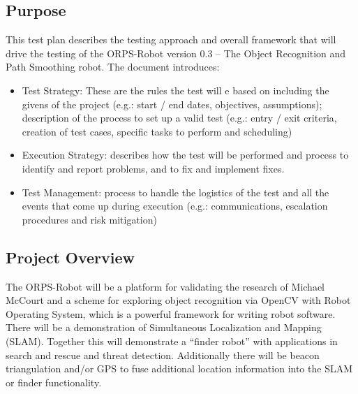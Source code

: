 \documentclass[english,12pt]{article}
\begin{document}
\subsection{Purpose}
This test plan describes the testing approach and overall 
framework that will drive the testing of the ORPS-Robot 
version 0.3 – The Object Recognition and Path Smoothing 
robot. The document introduces:
\begin{itemize}
	\item[] Test Strategy: These are the rules the test will e based on including 
    the givens of the project (e.g.: start / end dates, objectives, assumptions); 
    description of the process to set up a valid test (e.g.: entry / exit criteria, 
    creation of test cases, specific tasks to perform and scheduling)
	\item[] Execution Strategy: describes how the test will be performed 
    and process to identify and report problems, and to fix and implement 
    fixes.
    \item[] Test Management: process to handle the logistics of the test 
    and all the events that come up during execution (e.g.: communications, 
    escalation procedures and risk mitigation)
\end{itemize}
\subsection{Project Overview}
The ORPS-Robot will be a platform for validating the research of Michael McCourt 
and a scheme for exploring object recognition via OpenCV with Robot Operating System, 
which is a powerful framework for writing robot software. There will be a demonstration 
of Simultaneous Localization and Mapping (SLAM). Together this will demonstrate a ``finder
robot'' with applications in search and rescue and threat detection. Additionally there 
will be beacon triangulation and/or GPS to fuse additional location information into the 
SLAM or finder functionality.
\end{document}
